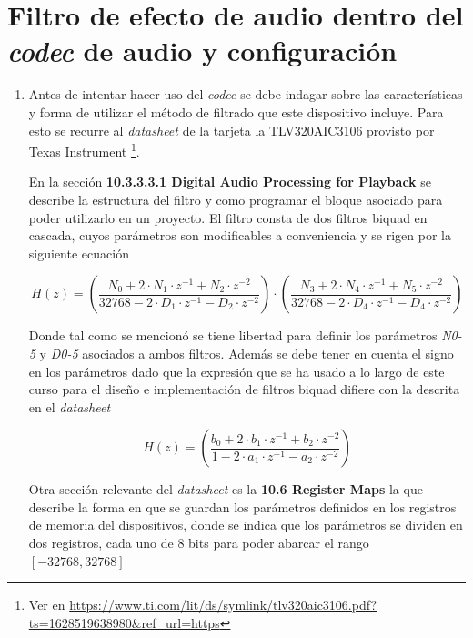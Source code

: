 \section{Filtro de efecto de audio dentro del \textit{codec} de audio y configuración}



\begin{enumerate}
    \item  Antes de intentar hacer uso del  \textit{codec} se debe indagar sobre las características y forma de utilizar el método de filtrado que este dispositivo incluye. Para esto se recurre al \textit{datasheet} de la tarjeta la \href{https://www.ti.com/lit/ds/symlink/tlv320aic3106.pdf?ts=1628519638980&ref_url=https}{TLV320AIC3106}  provisto por Texas Instrument \footnote{Ver en \href{https://www.ti.com/lit/ds/symlink/tlv320aic3106.pdf?ts=1628519638980&ref_url=https}{https://www.ti.com/lit/ds/symlink/tlv320aic3106.pdf?ts=1628519638980&ref_url=https} }.
    
    En la sección \textbf{10.3.3.3.1 Digital Audio Processing for Playback} se describe la estructura del filtro y como programar el bloque asociado para poder utilizarlo en un proyecto. El filtro consta de dos filtros biquad en cascada, cuyos parámetros son modificables a conveniencia y se rigen por la siguiente ecuación 
    
    
    
    $$   H(z) = \left (\frac{N_0 + 2\cdot N_1 \cdot z^{-1} + N_2 \cdot z^{-2}}{ 32768 - 2\cdot D_1 \cdot z^{-1} - D_2 \cdot z^{-2}} \right ) \cdot   \left (\frac{N_3+ 2\cdot N_4 \cdot z^{-1} + N_5 \cdot z^{-2}}{ 32768 - 2\cdot D_4 \cdot z^{-1} - D_4 \cdot z^{-2}} \right ) $$
    
    
    Donde tal como se mencionó se tiene libertad para definir los parámetros \textit{N0-5} y \textit{D0-5} asociados a ambos filtros. Además se debe tener en cuenta el signo en los parámetros dado que la expresión que se ha usado a lo largo de este curso para el diseño e implementación de filtros biquad difiere con la descrita en el \textit{datasheet}
    
    $$ H(z) = \left (\frac{b_0 + 2\cdot b_1 \cdot z^{-1} + b_2 \cdot z^{-2}}{ 1 - 2\cdot a_1 \cdot z^{-1} - a_2 \cdot z^{-2}} \right )$$
    
    
    Otra sección relevante del \textit{datasheet}  es la \textbf{10.6 Register Maps} la que describe la forma en que se guardan los parámetros definidos en los registros de memoria del dispositivos, donde se indica que los parámetros se dividen  en dos registros, cada uno de 8 bits para poder abarcar el rango $[-32768, 32768]$
    

\end{enumerate}
